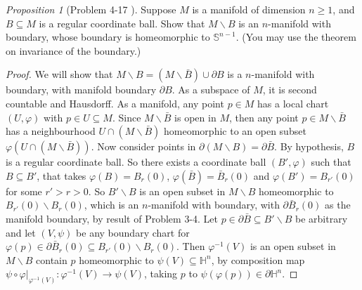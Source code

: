 \documentclass[a4paper]{article}
\theoremstyle{remark}
\newtheorem{prop}{Proposition}
\newcommand{\hn}{\mathbb{H}^n} %
\newcommand{\s}{\mathbb{S}} %
\newcommand{\doo}{\partial}    %
\newcommand{\subhim}{\subseteq} %
\begin{document}
\begin{prop}[Problem 4-17 \cite{LeeTM}]
	Suppose $M$ is a manifold of dimension $n \geq 1$, and $B \subhim M$ is a regular coordinate ball. Show that $M \smallsetminus B$ is an $n$-manifold with boundary, whose
	boundary is homeomorphic to $\s^{n-1}$. (You may use the theorem on invariance of the boundary.)
\end{prop}
\begin{proof}
	We will show that $M \smallsetminus B = (M\smallsetminus \bar{B}) \cup \doo B$ is a $n$-manifold with boundary, with manifold boundary $\doo B$. As a subspace of $M$, it is second countable and Hausdorff. As a manifold, any point $p\in M$ has a local chart $(U,\varphi)$ with $p\in U \subhim M$. Since $M\smallsetminus \bar{B}$ is open in $M$, then any point $p \in M \smallsetminus \bar{B}$ has a neighbourhood $U \cap (M\smallsetminus \bar{B})$ homeomorphic to an open subset $\varphi(U \cap (M\smallsetminus \bar{B}))$. Now consider points in $\doo (M\smallsetminus B) = \doo \bar{B}$. By hypothesis, $B$ is a regular coordinate ball. So there exists a coordinate ball $(B',\varphi)$ such that $B\subhim B'$, that takes $\varphi(B) = B_r(0)$, $\varphi(\bar{B}) = \bar{B}_r(0)$ and $\varphi(B') = B_{r'}(0)$ for some $r'>r>0$. So $B' \smallsetminus B$ is an open subset in $M\smallsetminus B$ homeomorphic to $B_{r'}(0) \smallsetminus B_r(0)$, which is an $n$-manifold with boundary, with $\doo \bar{B}_r(0)$  as the manifold boundary, by result of Problem 3-4. Let $p \in \doo \bar{B} \subhim B' \smallsetminus B$ be arbitrary and let $(V,\psi)$ be any boundary chart for  $\varphi(p) \in \doo \bar{B}_r(0) \subhim B_{r'}(0) \smallsetminus B_r(0)$. Then $\varphi^{-1}(V)$ is an open subset in $M\smallsetminus B$ contain $p$ homeomorphic to $\psi(V) \subhim \hn$, by composition map $\psi \circ \varphi|_{\varphi^{-1}(V)} : \varphi^{-1}(V) \to \psi(V)$, taking $p$ to $\psi(\varphi(p)) \in \doo \hn$. 
\end{proof}
\end{document}
